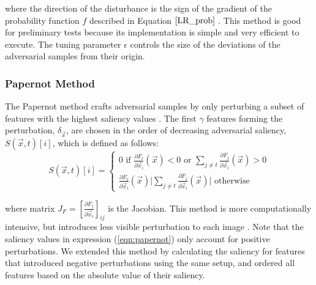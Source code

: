 where the direction of the disturbance is the sign of the gradient of the probability function $f$ described in Equation $\ref{LR_prob}$ \cite{fast_gradient_sign}. This method is good for preliminary tests because its implementation is simple and very efficient to execute. The tuning parameter $\epsilon$ controls the size of the deviations of the adversarial samples from their origin.

\subsubsection{Papernot Method}

The Papernot method crafts adversarial samples by only perturbing a subset of features with the highest saliency values \cite{papernot1}. %
The first $\gamma$ features forming the perturbation, $\delta_{\vec{x}}$, are chosen in the order of decreasing adversarial saliency, $S(\vec{x},t)[i]$, which is defined as follows:
\begin{equation} \label{eqn:papernot}
S(\vec{x},t)[i] = \begin{cases}
   0 \text{ if } \frac{\partial F_{t}}{\partial \vec{x}_{i}}(\vec{x}) < 0 \text{ or } \sum_{j \neq t} \frac{\partial F_{j}}{\partial \vec{x}_{i}}(\vec{x}) > 0 \\
   \frac{\partial F_{t}}{\partial \vec{x}_{i}}(\vec{x}) \vert \sum_{j \neq t} \frac{\partial F_{j}}{\partial \vec{x}_{i}}(\vec{x}) \vert \text{       otherwise}
\end{cases}
\end{equation}

where matrix $J_{F} = [\frac{\partial F_{j}}{\partial \vec{x}_{i}}]_{ij}$ is the Jacobian. This method is more computationally intensive, but introduces less visible perturbation to each image \cite{papernot1}. Note that the saliency values in expression (\ref{eqn:papernot}) only account for positive perturbations. We extended this method by calculating the saliency for features that introduced negative perturbations using the same setup, and ordered all features based on the absolute value of their saliency.

